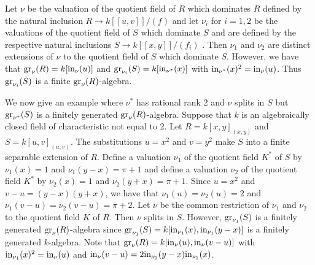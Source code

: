 \documentclass[11pt]{amsart}
\begin{document}
  Let $\nu$ be the valuation of the quotient field of $R$ which dominates $R$ defined by the natural inclusion $R\rightarrow k[[u,v]]/(f)$ and let $\nu_i$ for $i=1,2$  be the valuations of the quotient field of $S$ which dominate $S$ and are defined by the respective natural inclusions $S\rightarrow k[[x,y]]/(f_i)$ . Then $\nu_1$ and $\nu_2$ are distinct extensions of $\nu$ to the quotient field of $S$ which dominate $S$. However,
  we have that 
  $ {\rm gr}_{\nu}(R)=k[{\rm in}_{\nu}(u)]$ and ${\rm gr}_{\nu_i}(S)=k[{\rm in}_{\nu^*}(x)]$ with ${\rm in}_{\nu^*}(x)^2={\rm in}_{\nu}(u)$. Thus ${\rm gr}_{\nu_i}(S)$ is a finite  $ {\rm gr}_{\nu}(R)$-algebra. 
  
  
 We now give an example where $\nu^*$ has rational rank 2 and  $\nu$  splits in $S$ but ${\rm gr}_{\nu^*}(S)$ is a finitely generated ${\rm gr}_{\nu}(R)$-algebra. Suppose that $k$ is an algebraically closed field of characteristic not equal to 2.
  Let $R=k[x,y]_{(x,y)}$ and $S=k[u,v]_{(u,v)}$.  The substitutions $u=x^2$ and $v=y^2$ make $S$ into a finite separable extension of $R$. 
  Define a valuation $\nu_1$ of the quotient field $K^*$ of $S$ by $\nu_1(x)=1$ and $\nu_1(y-x)=\pi+1$ and define a valuation $\nu_2$ of the quotient field $K^*$ by $\nu_2(x)=1$ and $\nu_2(y+x)=\pi+1$.
Since $u=x^2$ and $v-u=(y-x)(y+x)$, we have that $\nu_1(u)=\nu_2(u)=2$ and $\nu_1(v-u)=\nu_2(v-u)=\pi+2$. Let $\nu$ be the common restriction of $\nu_1$ and $\nu_2$ to the quotient field $K$ of $R$.
Then $\nu$ splits in $S$. However, ${\rm gr}_{\nu_1}(S)$ is a finitely generated ${\rm gr}_{\nu}(R)$-algebra since 
${\rm gr}_{\nu_1}(S)=k[{\rm in}_{\nu_1}(x),{\rm in }_{\nu_1}(y-x)]$ is a finitely generated $k$-algebra.  Note that  ${\rm gr}_{\nu}(R)=k[{\rm in}_{\nu}(u),{\rm in }_{\nu}(v-u)]$ with 
${\rm in}_{\nu_1}(x)^2={\rm in}_{\nu}(u)$ and ${\rm in}_{\nu}(v-u)=2{\rm in}_{\nu_1}(y-x){\rm in}_{\nu_1}(x)$.


  
\end{document}
